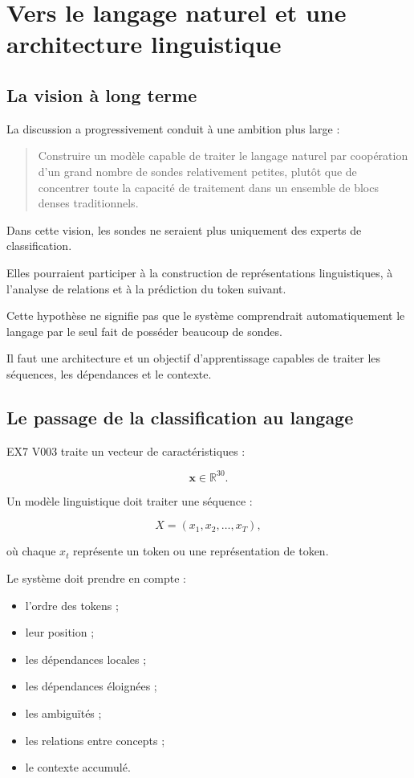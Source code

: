 \documentclass[11pt,a4paper]{report}
\newcommand{\R}{\mathbb{R}}
\newcommand{\vect}[1]{\bm{#1}}
\begin{document}
\chapter{Vers le langage naturel et une architecture linguistique}

\section{La vision à long terme}

La discussion a progressivement conduit à une ambition
plus large :

\begin{quote}
Construire un modèle capable de traiter le langage naturel
par coopération d'un grand nombre de sondes relativement
petites, plutôt que de concentrer toute la capacité de
traitement dans un ensemble de blocs denses traditionnels.
\end{quote}

Dans cette vision, les sondes ne seraient plus uniquement
des experts de classification.

Elles pourraient participer à la construction de
représentations linguistiques, à l'analyse de relations
et à la prédiction du token suivant.

Cette hypothèse ne signifie pas que le système comprendrait
automatiquement le langage par le seul fait de posséder
beaucoup de sondes.

Il faut une architecture et un objectif d'apprentissage
capables de traiter les séquences, les dépendances
et le contexte.

\section{Le passage de la classification au langage}

EX7 V003 traite un vecteur de caractéristiques :

\[
\vect{x}\in\R^{30}.
\]

Un modèle linguistique doit traiter une séquence :

\[
X=(x_1,x_2,\ldots,x_T),
\]

où chaque \(x_t\) représente un token ou une représentation
de token.

Le système doit prendre en compte :

\begin{itemize}
  \item l'ordre des tokens ;
  \item leur position ;
  \item les dépendances locales ;
  \item les dépendances éloignées ;
  \item les ambiguïtés ;
  \item les relations entre concepts ;
  \item le contexte accumulé.
\end{itemize}
\end{document}
